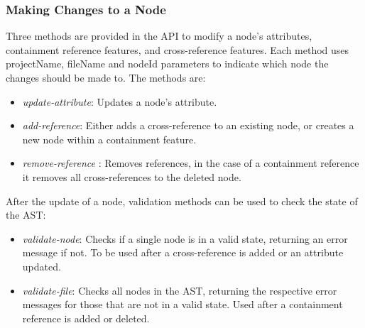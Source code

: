 \documentclass{article}
\begin{document}
{\subsubsection{Making Changes to a Node}
Three methods are provided in the API to modify a node's attributes, containment reference features, and cross-reference features. Each method uses projectName, fileName and nodeId parameters to indicate which node the changes should be made to. The methods are: 
\begin{itemize}
\item \emph{update-attribute}: Updates a node's attribute.
\item \emph{add-reference}: Either adds a cross-reference to an existing node, or creates a new node within a containment feature.
\item \emph{remove-reference} : Removes references, in the case of a containment reference it removes all cross-references to the deleted node.
\end{itemize} 
After the update of a node, validation methods can be used to check the state of the AST:
\begin{itemize}
\item \emph{validate-node}: Checks if a single node is in a valid state, returning an error message if not. To be used after a cross-reference is added or an attribute updated.
\item \emph{validate-file}: Checks all nodes in the AST, returning the respective error messages for those that are not in a valid state. Used after a containment reference is added or deleted.
\end{itemize}

}
\end{document}

